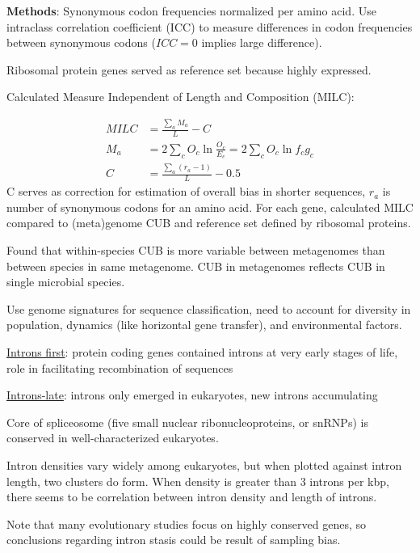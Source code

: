 \documentclass[11pt]{labbook}
\begin{document}
\textbf{Methods}:
Synonymous codon frequencies normalized per amino acid. Use intraclass correlation coefficient (ICC) to measure differences in codon frequencies between synonymous codons ($ICC = 0$ implies large difference). 

Ribosomal protein genes served as reference set because highly expressed. 

Calculated Measure Independent of Length and Composition (MILC):

\begin{align*}
MILC &= \frac{\sum_a M_a}{L} - C \\
M_a &= 2\sum_c O_c \ln{\frac{O_c}{E_c}} = 2\sum_c O_c \ln{f_c}{g_c} \\
C &= \frac{\sum_a \left(r_a-1\right)}{L} - 0.5
\end{align*}
C serves as correction for estimation of overall bias in shorter sequences, $r_a$ is number of synonymous codons for an amino acid.
For each gene, calculated MILC compared to (meta)genome CUB and reference set defined by ribosomal proteins. 

Found that within-species CUB is more variable between metagenomes than between species in same metagenome. CUB in metagenomes reflects CUB in single microbial species.


Use genome signatures for sequence classification, need to account for diversity in population, dynamics (like horizontal gene transfer), and environmental factors. 


\underline{Introns first}: protein coding genes contained introns at very early stages of life, role in facilitating recombination of sequences

\underline{Introns-late}: introns only emerged in eukaryotes, new introns accumulating

Core of spliceosome (five small nuclear ribonucleoproteins, or snRNPs) is conserved in well-characterized eukaryotes. 

Intron densities vary widely among eukaryotes, but when plotted against intron length, two clusters do form. When density is greater than 3 introns per kbp, there seems to be correlation between intron density and length of introns.

Note that many evolutionary studies focus on highly conserved genes, so conclusions regarding intron stasis could be result of sampling bias.
\end{document}
